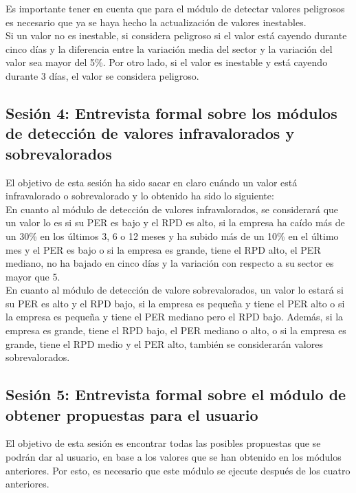 \documentclass[12pt]{article}
\begin{document}
Es importante tener en cuenta que para el módulo de detectar valores peligrosos es necesario que ya se haya hecho la actualización de valores inestables.\\

Si un valor no es inestable, si considera peligroso si el valor está cayendo durante cinco días y la diferencia entre la variación media del sector y la variación del valor sea mayor del 5\%. Por otro lado, si el valor es inestable y está cayendo durante 3 días, el valor se considera peligroso.

\subsection{Sesión 4: Entrevista formal sobre los módulos de detección de valores infravalorados y sobrevalorados}
El objetivo de esta sesión ha sido sacar en claro cuándo un valor está infravalorado o sobrevalorado y lo obtenido ha sido lo siguiente:\\

En cuanto al módulo de detección de valores infravalorados, se considerará que un valor lo es si su PER es bajo y el RPD es alto, si la empresa ha caído más de un 30\% en los últimos 3, 6 o 12 meses y ha subido más de un 10\% en el último mes y el PER es bajo o si la empresa es grande, tiene el RPD alto, el PER mediano, no ha bajado en cinco días y la variación con respecto a su sector es mayor que 5.\\

En cuanto al módulo de detección de valore sobrevalorados, un valor lo estará si su PER es alto y el RPD bajo, si la empresa es pequeña y tiene el PER alto o si la empresa es pequeña y tiene el PER mediano pero el RPD bajo. Además, si la empresa es grande, tiene el RPD bajo, el PER mediano o alto, o si la empresa es grande, tiene el RPD medio y el PER alto, también se considerarán valores sobrevalorados.\\

\subsection{Sesión 5: Entrevista formal sobre el módulo de obtener propuestas para el usuario}
El objetivo de esta sesión es encontrar todas las posibles propuestas que se podrán dar al usuario, en base a los valores que se han obtenido en los módulos anteriores. Por esto, es necesario que este módulo se ejecute después de los cuatro anteriores.
\end{document}
